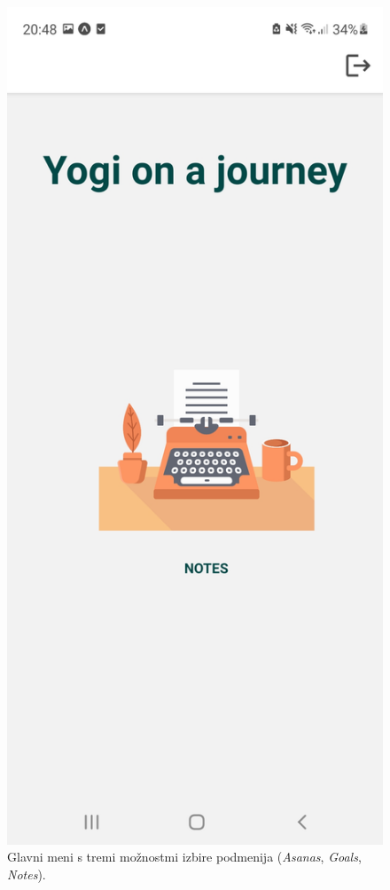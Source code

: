 \documentclass[a4paper, 12pt]{book}
\begin{document}
\begin{figure}[!ht]
\begin{minipage}[b]{0.325\textwidth}
  \end{minipage}
  \begin{minipage}[b]{0.325\textwidth}
    \includegraphics[width=\textwidth]{menu3.jpg}\centering
  \end{minipage}
    \caption{Glavni meni s tremi možnostmi izbire podmenija (\textit{Asanas}, \textit{Goals}, \textit{Notes}).}
\end{figure} 
\end{document}
